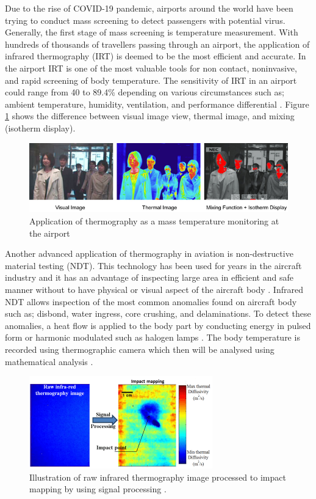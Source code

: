 \noindent Due to the rise of COVID-19 pandemic, airports around the world have been trying to conduct mass screening to detect passengers with potential virus. Generally, the first stage of mass screening is temperature measurement. With hundreds of thousands of travellers passing through an airport, the application of infrared thermography (IRT) is deemed to be the most efficient and accurate. In the airport IRT is one of the most valuable tools for non contact, noninvasive, and rapid screening of body temperature.  The sensitivity of IRT in an airport could range from 40 to 89.4\% depending on various circumstances such as; ambient temperature, humidity, ventilation, and performance differential \cite{Sun2017ApplicationsStations}. Figure \ref{fig:airport_IR} shows the difference between visual image view, thermal image, and mixing (isotherm display).\\

\begin{figure}[!ht]
    \centering
    \includegraphics[scale=0.65]{Figures/IR_airport.jpg}
    \caption{Application of thermography as a mass temperature monitoring at the airport \cite{AnonymousBodyCO.LTD.}}
    \label{fig:airport_IR}
\end{figure}

\noindent Another advanced application of thermography in aviation is non-destructive material testing (NDT). This technology has been used for years in the aircraft industry and it has an advantage of inspecting large area in efficient and safe manner without to have physical or visual aspect of the aircraft body \cite{Ibarra-CastanedoInfraredMaterials}. Infrared NDT allows inspection of  the most common anomalies found on aircraft body such as; disbond, water ingress, core crushing, and delaminations. To detect these anomalies, a heat flow is applied to the body part by conducting energy in pulsed form or harmonic modulated such as halogen lamps \cite{Stumper2015ThermalAviation}. The body temperature is recorded using thermographic camera which then will be analysed using mathematical analysis \cite{Anonymous2013InformationImprovement}.\\

\begin{figure}[!ht]
    \centering
    \includegraphics[scale=1.2]{Figures/IR_NDT.png}
    \caption{Illustration of raw infrared thermography image processed to impact mapping by using signal processing \cite{Non-destructiveLab}.}
    \label{fig:ndt_av}
\end{figure}
 

